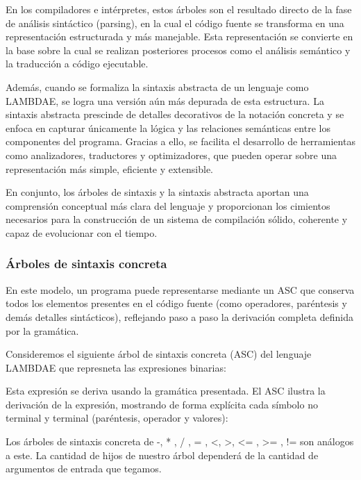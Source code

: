 \documentclass[a4paper,12pt]{article}
\begin{document}
En los compiladores e intérpretes, estos árboles son el resultado directo de la fase de análisis sintáctico (parsing), en la cual el código fuente se transforma en una representación estructurada y más manejable. Esta representación se convierte en la base sobre la cual se realizan posteriores procesos como el análisis semántico y la traducción a código ejecutable.

Además, cuando se formaliza la sintaxis abstracta de un lenguaje como LAMBDAE, se logra una versión aún más depurada de esta estructura. La sintaxis abstracta prescinde de detalles decorativos de la notación concreta y se enfoca en capturar únicamente la lógica y las relaciones semánticas entre los componentes del programa. Gracias a ello, se facilita el desarrollo de herramientas como analizadores, traductores y optimizadores, que pueden operar sobre una representación más simple, eficiente y extensible.

En conjunto, los árboles de sintaxis y la sintaxis abstracta aportan una comprensión conceptual más clara del lenguaje y proporcionan los cimientos necesarios para la construcción de un sistema de compilación sólido, coherente y capaz de evolucionar con el tiempo.

\subsubsection{Árboles de sintaxis concreta}


En este modelo, un programa puede representarse mediante un ASC que conserva todos los elementos presentes en el código fuente (como operadores, paréntesis y demás detalles sintácticos), reflejando paso a paso la derivación completa definida por la gramática.

Consideremos el siguiente árbol de sintaxis concreta (ASC) del lenguaje LAMBDAE que represneta las expresiones binarias:

Esta expresión se deriva usando la gramática presentada. El ASC ilustra la
derivación de la expresión, mostrando de forma explícita cada símbolo no terminal y terminal
(paréntesis, operador y valores):

\begin{center}


\end{center}
Los árboles de sintaxis concreta de -, * , / , = , <, >, <= , >= , !=  son análogos a este.
La cantidad de hijos de nuestro árbol dependerá de la cantidad de argumentos de entrada que tegamos.
\end{document}
